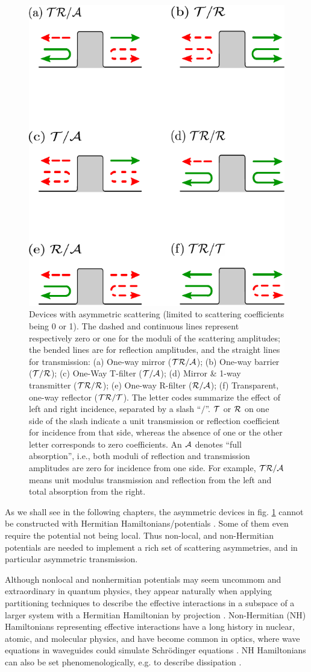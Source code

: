 \begin{figure}
  \center
  \includegraphics[width = 0.5\linewidth]{Figures/PotentialCasesPT.pdf}
  \caption{Devices with asymmetric scattering (limited to scattering coefficients being 0 or 1).  The dashed and continuous lines represent respectively zero or one
  for the moduli of the scattering amplitudes; the bended lines are for reflection amplitudes, and the straight lines for transmission:
  (a) One-way mirror ($\cal{TR/A}$); (b) One-way barrier ($\cal{T/R}$); (c) One-Way T-filter ($\cal{T/A}$);
  (d) Mirror \& 1-way transmitter ($\cal{TR/R}$); (e) One-way R-filter ($\cal{R/A}$); (f) Transparent, one-way
  reflector ($\cal{TR/T}$).
  The letter codes summarize the effect of left and right incidence, separated by a  slash ``$/$''.
  ${\cal T}$ or ${\cal R}$ on one side of the slash indicate a unit
  transmission or reflection coefficient
  for  incidence from that side, whereas the absence of one or the other letter corresponds to zero coefficients.
  An ${\cal A}$ denotes ``full absorption'', i.e., both moduli of reflection and transmission amplitudes are zero for incidence from one side.
  For example,  $\cal{TR/A}$ means unit modulus transmission
  and reflection from the left and total absorption from the right.
  \label{cases}}
\end{figure}

As we shall see in the following chapters, the asymmetric devices in fig. \ref{cases} cannot be constructed with Hermitian Hamiltonians/potentials \cite{Muga2004,Mostafazadeh2018}. Some of them even require the potential not being local. Thus  non-local, and non-Hermitian potentials are needed to implement a rich set of scattering asymmetries, and in particular asymmetric transmission.

Although nonlocal and nonhermitian potentials may seem uncommom and extraordinary in quantum physics, they appear naturally when applying partitioning techniques to describe the effective interactions in a subspace of a larger system with a Hermitian Hamiltonian by projection \cite{Feshbach1958,Ruschhaupt2004,Muga2004}. Non-Hermitian (NH) Hamiltonians representing effective interactions have a long history in nuclear, atomic, and molecular physics, and have become common in optics, where wave equations in waveguides could simulate  Schr\"odinger equations \cite{Ruschhaupt2005,Longhi2017a,Konotop2016}. NH Hamiltonians can also be set phenomenologically, e.g. to describe dissipation \cite{Ruschhaupt2005}.

